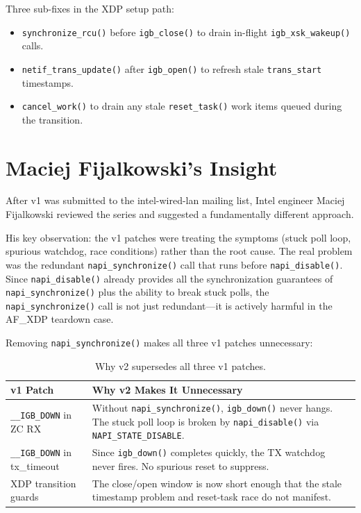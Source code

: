 \documentclass[11pt,a4paper,openany]{book}
\newcommand{\func}[1]{\texttt{#1()}}
\newcommand{\flag}[1]{\texttt{#1}}
\begin{document}
Three sub-fixes in the XDP setup path:
\begin{itemize}
\item \func{synchronize\_rcu} before \func{igb\_close} to drain
    in-flight \func{igb\_xsk\_wakeup} calls.
\item \func{netif\_trans\_update} after \func{igb\_open} to refresh
    stale \texttt{trans\_start} timestamps.
\item \func{cancel\_work} to drain any stale \func{reset\_task}
    work items queued during the transition.
\end{itemize}

\section{Maciej Fijalkowski's Insight}

After v1 was submitted to the intel-wired-lan mailing list, Intel
engineer Maciej Fijalkowski
reviewed the series and suggested a fundamentally different approach.

His key observation: the v1 patches were treating the symptoms (stuck
poll loop, spurious watchdog, race conditions) rather than the root
cause.  The real problem was the redundant \func{napi\_synchronize}
call that runs before \func{napi\_disable}.  Since \func{napi\_disable}
already provides all the synchronization guarantees of
\func{napi\_synchronize} plus the ability to break stuck polls, the
\func{napi\_synchronize} call is not just redundant---it is actively
harmful in the AF\_XDP teardown case.

Removing \func{napi\_synchronize} makes all three v1 patches
unnecessary:

\begin{table}[H]
\centering
\begin{tabular}{lp{8cm}}
\toprule
\textbf{v1 Patch} & \textbf{Why v2 Makes It Unnecessary} \\
\midrule
\texttt{\_\_IGB\_DOWN} in ZC RX &
    Without \func{napi\_synchronize}, \func{igb\_down} never hangs.
    The stuck poll loop is broken by \func{napi\_disable} via
    \flag{NAPI\_STATE\_DISABLE}.  \\
\texttt{\_\_IGB\_DOWN} in tx\_timeout &
    Since \func{igb\_down} completes quickly, the TX watchdog never
    fires.  No spurious reset to suppress.  \\
XDP transition guards &
    The close/open window is now short enough that the stale timestamp
    problem and reset-task race do not manifest.  \\
\bottomrule
\end{tabular}
\caption{Why v2 supersedes all three v1 patches.}
\end{table}
\end{document}
